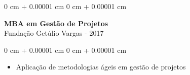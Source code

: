 \documentclass[10pt, letterpaper]{article}
\newenvironment{highlights}{
    \begin{itemize}[
        topsep=0.10 cm,
        parsep=0.10 cm,
        partopsep=0pt,
        itemsep=0pt,
        leftmargin=0 cm + 10pt
    ]
}{
    \end{itemize}
}
\newenvironment{onecolentry}{
    \begin{adjustwidth}{
        0 cm + 0.00001 cm
    }{
        0 cm + 0.00001 cm
    }
}{
    \end{adjustwidth}
}
\begin{document}
\vspace{0.2cm}

\begin{onecolentry}
    \setcolumnwidth{\fill, 4.5cm}
    \begin{paracol}{2}
        \textbf{MBA em Gestão de Projetos} \\ Fundação Getúlio Vargas
        \switchcolumn
         - 2017
    \end{paracol}
\end{onecolentry}
\vspace{0.10cm}
\begin{onecolentry}
    \begin{highlights}
                \item Aplicação de metodologias ágeis em gestão de projetos
    \end{highlights}
\end{onecolentry}
\end{document}
